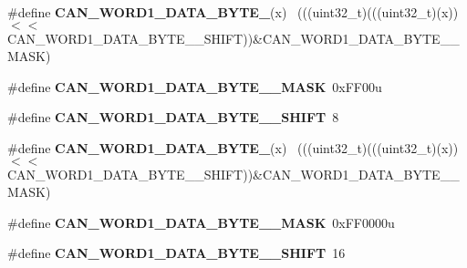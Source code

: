 \begin{DoxyCompactItemize}
\item 
\hypertarget{group___c_a_n___register___masks_ga17b41e838c3daa9752f0237ae658daed}{}\#define {\bfseries C\+A\+N\+\_\+\+W\+O\+R\+D1\+\_\+\+D\+A\+T\+A\+\_\+\+B\+Y\+T\+E\+\_}(x)                              ~(((uint32\+\_\+t)(((uint32\+\_\+t)(x))$<$$<$C\+A\+N\+\_\+\+W\+O\+R\+D1\+\_\+\+D\+A\+T\+A\+\_\+\+B\+Y\+T\+E\+\_\+\_\+\+S\+H\+I\+F\+T))\&C\+A\+N\+\_\+\+W\+O\+R\+D1\+\_\+\+D\+A\+T\+A\+\_\+\+B\+Y\+T\+E\+\_\+\_\+\+M\+A\+S\+K)\label{group___c_a_n___register___masks_ga17b41e838c3daa9752f0237ae658daed}

\item 
\hypertarget{group___c_a_n___register___masks_ga2a3649044e37e695317cff5b42d9c4f1}{}\#define {\bfseries C\+A\+N\+\_\+\+W\+O\+R\+D1\+\_\+\+D\+A\+T\+A\+\_\+\+B\+Y\+T\+E\+\_\+\_\+\+M\+A\+S\+K}~0x\+F\+F00u\label{group___c_a_n___register___masks_ga2a3649044e37e695317cff5b42d9c4f1}

\item 
\hypertarget{group___c_a_n___register___masks_gadfb68bcd398c238b56d716fa3a8ec4ee}{}\#define {\bfseries C\+A\+N\+\_\+\+W\+O\+R\+D1\+\_\+\+D\+A\+T\+A\+\_\+\+B\+Y\+T\+E\+\_\+\_\+\+S\+H\+I\+F\+T}~8\label{group___c_a_n___register___masks_gadfb68bcd398c238b56d716fa3a8ec4ee}

\item 
\hypertarget{group___c_a_n___register___masks_ga96fbf644e731994ebf8519bd156c675f}{}\#define {\bfseries C\+A\+N\+\_\+\+W\+O\+R\+D1\+\_\+\+D\+A\+T\+A\+\_\+\+B\+Y\+T\+E\+\_}(x)                              ~(((uint32\+\_\+t)(((uint32\+\_\+t)(x))$<$$<$C\+A\+N\+\_\+\+W\+O\+R\+D1\+\_\+\+D\+A\+T\+A\+\_\+\+B\+Y\+T\+E\+\_\+\_\+\+S\+H\+I\+F\+T))\&C\+A\+N\+\_\+\+W\+O\+R\+D1\+\_\+\+D\+A\+T\+A\+\_\+\+B\+Y\+T\+E\+\_\+\_\+\+M\+A\+S\+K)\label{group___c_a_n___register___masks_ga96fbf644e731994ebf8519bd156c675f}

\item 
\hypertarget{group___c_a_n___register___masks_ga9762ba9b3f8288f68e3db1e0d2deccaf}{}\#define {\bfseries C\+A\+N\+\_\+\+W\+O\+R\+D1\+\_\+\+D\+A\+T\+A\+\_\+\+B\+Y\+T\+E\+\_\+\_\+\+M\+A\+S\+K}~0x\+F\+F0000u\label{group___c_a_n___register___masks_ga9762ba9b3f8288f68e3db1e0d2deccaf}

\item 
\hypertarget{group___c_a_n___register___masks_ga74e324a0ea45adbeeafd694ddebc4e02}{}\#define {\bfseries C\+A\+N\+\_\+\+W\+O\+R\+D1\+\_\+\+D\+A\+T\+A\+\_\+\+B\+Y\+T\+E\+\_\+\_\+\+S\+H\+I\+F\+T}~16\label{group___c_a_n___register___masks_ga74e324a0ea45adbeeafd694ddebc4e02}


\end{DoxyCompactItemize}
